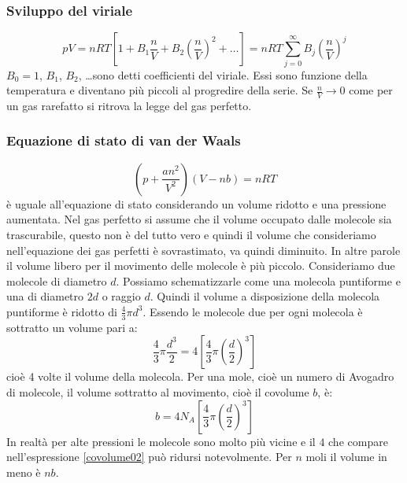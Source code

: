 \subsubsection{Sviluppo del viriale}
\begin{equation}
	pV=nRT\left[1+B_1\frac{n}{V}+B_2\left(\frac{n}{V}\right)^2+\ldots\right]=nRT\sum_{j=0}^\infty B_j\left(\frac{n}{V}\right)^j
\end{equation}
$B_0=1$, $B_1$, $B_2$, \ldots sono detti coefficienti del viriale. Essi sono funzione della temperatura e diventano più piccoli al progredire della serie. Se $\frac{n}{V}\to 0$ come per un gas rarefatto si ritrova la legge del gas perfetto.
\subsubsection{Equazione di stato di van der Waals}
\begin{equation}
	\left(p+\frac{an^2}{V^2}\right)(V-nb)=nRT
\end{equation}
è uguale all'equazione di stato considerando un volume ridotto e una pressione aumentata. Nel gas perfetto si assume che il volume occupato dalle molecole sia trascurabile, questo non è del tutto vero e quindi il volume che consideriamo nell'equazione dei gas perfetti è sovrastimato, va quindi diminuito. In altre parole il volume libero per il movimento delle molecole è più piccolo. Consideriamo due molecole di diametro $d$. Possiamo schematizzarle come una molecola puntiforme e una di diametro $2d$ o raggio $d$. Quindi il volume a disposizione della molecola puntiforme è ridotto di $\frac{4}{3}\pi d^3$. Essendo le molecole due per ogni molecola è sottratto un volume pari a:
\begin{equation}
	\frac{4}{3}\pi\frac{d^3}{2}=4\left[\frac{4}{3}\pi\left(\frac{d}{2}\right)^3\right]
\end{equation}
cioè 4 volte il volume della molecola. Per una mole, cioè un numero di Avogadro di molecole, il volume sottratto al movimento, cioè il covolume $b$, è:
\begin{equation}
	b=4N_A\left[\frac{4}{3}\pi\left(\frac{d}{2}\right)^3\right]
	\label{covolume02}
\end{equation}
In realtà per alte pressioni le molecole sono molto più vicine e il $4$ che compare nell'espressione \eqref{covolume02} può ridursi notevolmente. Per $n$ moli il volume in meno è $nb$.

